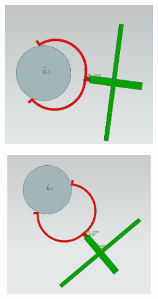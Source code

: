 \documentclass[12pt]{article}
\begin{document}
{\begin{figure}[H]
\begin{subfigure}{0.19\textwidth}
		\centering\includegraphics[height=6cm,width=1\textwidth,keepaspectratio]{var8_5.jpeg}
		\caption{}
		\label{fig:var8_5.jpeg}
	\end{subfigure}
	\begin{subfigure}{0.19\textwidth}
		\centering\includegraphics[height=6cm,width=1\textwidth,keepaspectratio]{var8_6.jpeg}
		\caption{}
		\label{fig:var8_6.jpeg}
	\end{subfigure}
	\end{figure}
}
\end{document}
